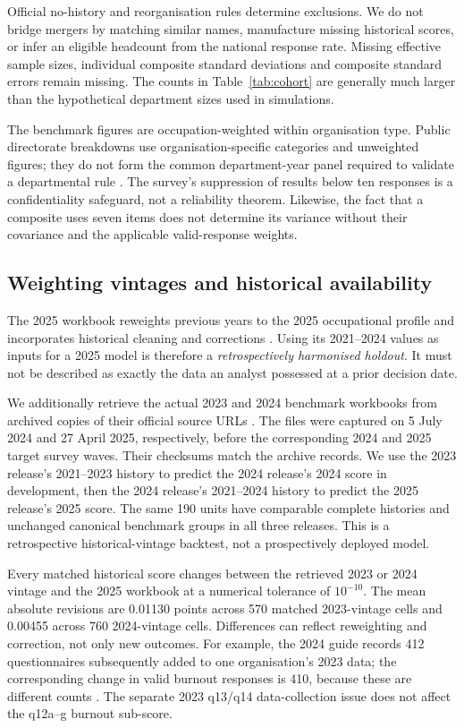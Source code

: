 \documentclass[11pt,letterpaper]{article}
\begin{document}
Official no-history and reorganisation rules determine exclusions. We do not bridge mergers by matching similar names, manufacture missing historical scores, or infer an eligible headcount from the national response rate. Missing effective sample sizes, individual composite standard deviations and composite standard errors remain missing. The counts in Table~\ref{tab:cohort} are generally much larger than the hypothetical department sizes used in simulations.

The benchmark figures are occupation-weighted within organisation type. Public directorate breakdowns use organisation-specific categories and unweighted figures; they do not form the common department-year panel required to validate a departmental rule \citep{nhs2026faq,nhs2026information}. The survey's suppression of results below ten responses is a confidentiality safeguard, not a reliability theorem. Likewise, the fact that a composite uses seven items does not determine its variance without their covariance and the applicable valid-response weights.

\subsection{Weighting vintages and historical availability}
The 2025 workbook reweights previous years to the 2025 occupational profile and incorporates historical cleaning and corrections \citep{nhs2025technical}. Using its 2021--2024 values as inputs for a 2025 model is therefore a \emph{retrospectively harmonised holdout}. It must not be described as exactly the data an analyst possessed at a prior decision date.

We additionally retrieve the actual 2023 and 2024 benchmark workbooks from archived copies of their official source URLs \citep{nhs2023archived,nhs2024archived}. The files were captured on 5 July 2024 and 27 April 2025, respectively, before the corresponding 2024 and 2025 target survey waves. Their checksums match the archive records. We use the 2023 release's 2021--2023 history to predict the 2024 release's 2024 score in development, then the 2024 release's 2021--2024 history to predict the 2025 release's 2025 score. The same 190 units have comparable complete histories and unchanged canonical benchmark groups in all three releases. This is a retrospective historical-vintage backtest, not a prospectively deployed model.

Every matched historical score changes between the retrieved 2023 or 2024 vintage and the 2025 workbook at a numerical tolerance of $10^{-10}$. The mean absolute revisions are 0.01130 points across 570 matched 2023-vintage cells and 0.00455 across 760 2024-vintage cells. Differences can reflect reweighting and correction, not only new outcomes. For example, the 2024 guide records 412 questionnaires subsequently added to one organisation's 2023 data; the corresponding change in valid burnout responses is 410, because these are different counts \citep{nhs2024technical}. The separate 2023 q13/q14 data-collection issue does not affect the q12a--g burnout sub-score.
\end{document}

